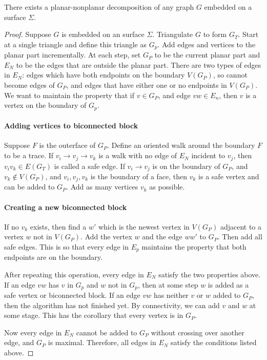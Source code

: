 \begin{claim}
	There exists a planar-nonplanar decomposition of any graph $G$ embedded on a surface $\Sigma$. 
\end{claim}
\begin{proof}
	Suppose \(G\) is embedded on an surface \(\Sigma\). Triangulate \(G\) to form \(G_T\). Start at a single triangle and define this triangle as $G_p$. Add edges and vertices to the planar part incrementally. At each step, set \(G_P\) to be the current planar part and \(E_N\) to be the edges that are outside the planar part. There are two types of edges in \(E_N\): edges which have both endpoints on the boundary \(V(G_P)\), so cannot become edges of \(G_P\), and edges that have either one or no endpoints in \(V(G_P)\). We want to maintain the property that if \(v \in G_P\), and edge \(vw \in E_n\), then \(v\) is a vertex on the boundary of \(G_p\).
	\paragraph{Adding vertices to biconnected block}
	Suppose $F$ is the outerface of \(G_P\). Define an oriented walk around the boundary $F$ to be a trace. If \(v_i \rightarrow v_j \rightarrow v_k\) is a walk with no edge of \(E_N\) incident to \(v_j\), then \(v_i v_k \in E(G_T)\) is called a safe edge. If \(v_i \rightarrow v_j\) is on the boundary of \(G_P\), and \(v_k \notin V(G_P)\), and \(v_i,v_j,v_k\) is the boundary of a face, then \(v_k\) is a safe vertex and can be added to \(G_P\). Add as many vertices $v_k$ as possible. 
	\paragraph{Creating a new biconnected block}
	If no \(v_k\) exists, then find a \(w'\) which is the newest vertex in \(V(G_P)\) adjacent to a vertex \(w\) not in \(V(G_P)\). Add the vertex \(w\) and the edge \(w w'\) to \(G_P\). Then add all safe edges. This is so that every edge in \(E_p\) maintains the property that both endpoints are on the boundary.
	
	After repeating this operation, every edge in \(E_N\) satisfy the two properties above. If an edge \(vw\) has \(v\) in $G_p$ and $w$ not in $G_p$, then at some step \(w\) is added as a safe vertex or biconnected block. If an edge \(vw\) has neither \(v\) or \(w\) added to \(G_P\), then the algorithm has not finished yet. By connectivity, we can add \(v\) and \(w\) at some stage. This has the corollary that every vertex is in \(G_P\).
	
	Now every edge in \(E_N\) cannot be added to \(G_P\) without crossing over another edge, and \(G_P\) is maximal. Therefore, all edges in \(E_N\) satisfy the conditions listed above.
\end{proof}

